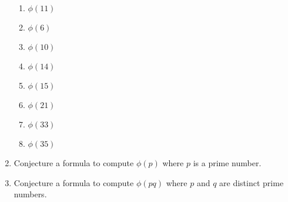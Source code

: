 \documentclass[12pt]{amsart}
\theoremstyle{definition}
\theoremstyle{remark}
\numberwithin{equation}{section}
\begin{document}
\begin{enumerate}
\begin{enumerate}
\item $\phi(11)$
\item $\phi(6)$
\item $\phi(10)$
\item $\phi(14)$
\item $\phi(15)$
\item $\phi(21)$
\item $\phi(33)$
\item $\phi(35)$
\end{enumerate}
\item Conjecture a formula to compute $\phi(p)$ where $p$ is a prime number.
\item Conjecture a formula to compute $\phi(pq)$ where $p$ and $q$ are distinct prime numbers.
\end{enumerate}
\vfill
\end{document}
